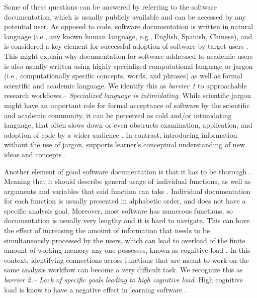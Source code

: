 \documentclass[12pt]{article}
\begin{document}
Some of these questions can be answered by referring to the software documentation, which is usually publicly available and can be accessed by any potential user.
As opposed to code, software documentation is written in natural language (i.e., any known human language, e.g., English, Spanish, Chinese), and is considered a key element for successful adoption of software by target users \citep{karimzadeh2018top}. This might explain why documentation for software addressed to academic users is also usually written using highly specialized computational language or jargon (i.e., computationally specific concepts, words, and phrases) as well as formal scientific and academic language.
We identify this as \textit{barrier 1} to approachable research workflows.-- \textit{Specialized language is intimidating}.
While scientific jargon might have an important role for formal acceptance of software by the scientific and academic community, it can be perceived as cold and/or intimidating language, that often slows down or even obstructs examination, application, and adoption of code by a wider audience \citep{ball2017its}.
In contrast, introducing information without the use of jargon, supports learner's conceptual understanding of new ideas and concepts \citep{mcdonnell2016concepts, pan2019online}.

Another element of good software documentation is that it has to be thorough \citep{karimzadeh2018top}.
Meaning that it should describe general usage of individual functions, as well as arguments and variables that said function can take \citep{karimzadeh2018top}.
Individual documentation for each function is usually presented in alphabetic order, and does not have a specific analysis goal.
Moreover, most software has numerous functions, so documentation is usually very lengthy and it is hard to navigate.
This can have the effect of increasing the amount of information that needs to be simultaneously processed by the users, which can lead to overload of the finite amount of working memory any one possesses, known as cognitive load \citep{sweller1988cognitive}.
In this context, identifying connections across functions that are meant to work on the same analysis workflow can become a very difficult task.
We recognize this as \textit{barrier 2.-- Lack of specific goals leading to high cognitive load}.
High cognitive load is know to have a negative effect in learning software \citep{chandler1996cognitive, van2005research, lambert2009student}.
\end{document}
